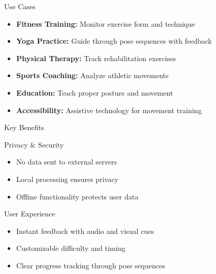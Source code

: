 \documentclass[11pt]{beamer}
\begin{document}
\begin{frame}{Use Cases}
    \begin{itemize}
        \item \textbf{Fitness Training:} Monitor exercise form and technique
        \item \textbf{Yoga Practice:} Guide through pose sequences with feedback
        \item \textbf{Physical Therapy:} Track rehabilitation exercises
        \item \textbf{Sports Coaching:} Analyze athletic movements
        \item \textbf{Education:} Teach proper posture and movement
        \item \textbf{Accessibility:} Assistive technology for movement training
    \end{itemize}
\end{frame}

\begin{frame}{Key Benefits}
    \begin{block}{Privacy & Security}
        \begin{itemize}
            \item No data sent to external servers
            \item Local processing ensures privacy
            \item Offline functionality protects user data
        \end{itemize}
    \end{block}
    \begin{block}{User Experience}
        \begin{itemize}
            \item Instant feedback with audio and visual cues
            \item Customizable difficulty and timing
            \item Clear progress tracking through pose sequences
        \end{itemize}
    \end{block}
\end{frame}
\end{document}
